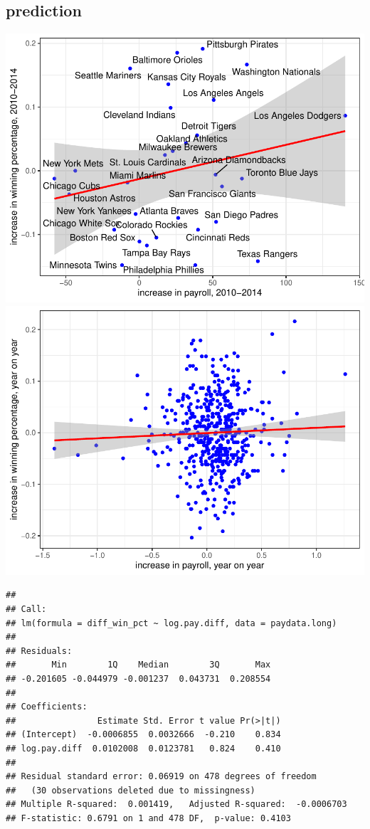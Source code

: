 \documentclass[
  12pt,
]{article}
\begin{document}
\hypertarget{prediction}{%
\subsection{prediction}\label{prediction}}

\includegraphics{hw1_sol_files/figure-latex/unnamed-chunk-17-1.pdf}
\includegraphics{hw1_sol_files/figure-latex/unnamed-chunk-17-2.pdf}

\begin{verbatim}
## 
## Call:
## lm(formula = diff_win_pct ~ log.pay.diff, data = paydata.long)
## 
## Residuals:
##       Min        1Q    Median        3Q       Max 
## -0.201605 -0.044979 -0.001237  0.043731  0.208554 
## 
## Coefficients:
##                Estimate Std. Error t value Pr(>|t|)
## (Intercept)  -0.0006855  0.0032666  -0.210    0.834
## log.pay.diff  0.0102008  0.0123781   0.824    0.410
## 
## Residual standard error: 0.06919 on 478 degrees of freedom
##   (30 observations deleted due to missingness)
## Multiple R-squared:  0.001419,   Adjusted R-squared:  -0.0006703 
## F-statistic: 0.6791 on 1 and 478 DF,  p-value: 0.4103
\end{verbatim}
\end{document}
